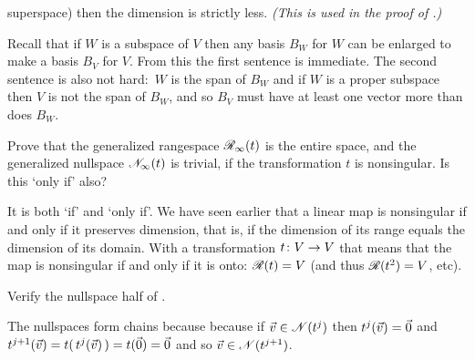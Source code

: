 \begin{exercises}
    superspace) then the dimension is strictly less.
    \textit{(This is used in the proof of
             .)}
    \begin{answer}
      Recall that if $W$ is a subspace of $V$ then any basis $B_W$ for $W$
      can be 
      enlarged to make a basis $B_V$ for $V$.
      From this the first sentence is immediate.
      The second sentence is also not hard:~$W$ is the span of $B_W$ and
      if $W$ is a proper subspace then $V$ is not the span of $B_W$, and
      so $B_V$ must have at least one vector more than does $B_W$.     
    \end{answer}
  \item 
    Prove that the generalized rangespace $\mathscr{R}_\infty(t)$ is the
    entire space, and the generalized nullspace $\mathscr{N}_\infty(t)$ is trivial,
    if the transformation $t$ is nonsingular.
    Is this `only if' also?
    \begin{answer}
      It is both `if' and `only if'.
      We have seen earlier that a linear map is nonsingular
      if and only if it preserves dimension, that is, if the dimension of 
      its range equals the dimension of its domain.
      With a transformation $\mbox{$t\colon V\to V$}$ that means that 
      the map is nonsingular if and only if it is onto:
      $\mathscr{R}(t)=V$ (and thus $\mathscr{R}(t^2)=V$, etc).
    \end{answer}
  \item \label{exer:RangeAndNullChains} 
    Verify the nullspace half of .
    \begin{answer}
      The nullspaces form chains because
      because if $\vec{v}\in\mathscr{N}(t^j)$ then $t^j(\vec{v})=\vec{0}$
      and $t^{j+1}(\vec{v})=t(\,t^j(\vec{v})\,)=t(\vec{0})=\vec{0}$ and
      so $\vec{v}\in\mathscr{N}(t^{j+1})$.


\end{answer}
\end{exercises}
